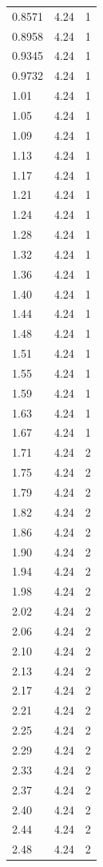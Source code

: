 \begin{longtable}{lrr}
  0.8571 & 4.24 & 1 \\
  0.8958 & 4.24 & 1 \\
  0.9345 & 4.24 & 1 \\
  0.9732 & 4.24 & 1 \\
  1.01 & 4.24 & 1 \\
  1.05 & 4.24 & 1 \\
  1.09 & 4.24 & 1 \\
  1.13 & 4.24 & 1 \\
  1.17 & 4.24 & 1 \\
  1.21 & 4.24 & 1 \\
  1.24 & 4.24 & 1 \\
  1.28 & 4.24 & 1 \\
  1.32 & 4.24 & 1 \\
  1.36 & 4.24 & 1 \\
  1.40 & 4.24 & 1 \\
  1.44 & 4.24 & 1 \\
  1.48 & 4.24 & 1 \\
  1.51 & 4.24 & 1 \\
  1.55 & 4.24 & 1 \\
  1.59 & 4.24 & 1 \\
  1.63 & 4.24 & 1 \\
  1.67 & 4.24 & 1 \\
  1.71 & 4.24 & 2 \\
  1.75 & 4.24 & 2 \\
  1.79 & 4.24 & 2 \\
  1.82 & 4.24 & 2 \\
  1.86 & 4.24 & 2 \\
  1.90 & 4.24 & 2 \\
  1.94 & 4.24 & 2 \\
  1.98 & 4.24 & 2 \\
  2.02 & 4.24 & 2 \\
  2.06 & 4.24 & 2 \\
  2.10 & 4.24 & 2 \\
  2.13 & 4.24 & 2 \\
  2.17 & 4.24 & 2 \\
  2.21 & 4.24 & 2 \\
  2.25 & 4.24 & 2 \\
  2.29 & 4.24 & 2 \\
  2.33 & 4.24 & 2 \\
  2.37 & 4.24 & 2 \\
  2.40 & 4.24 & 2 \\
  2.44 & 4.24 & 2 \\
  2.48 & 4.24 & 2 \\

\end{longtable}
